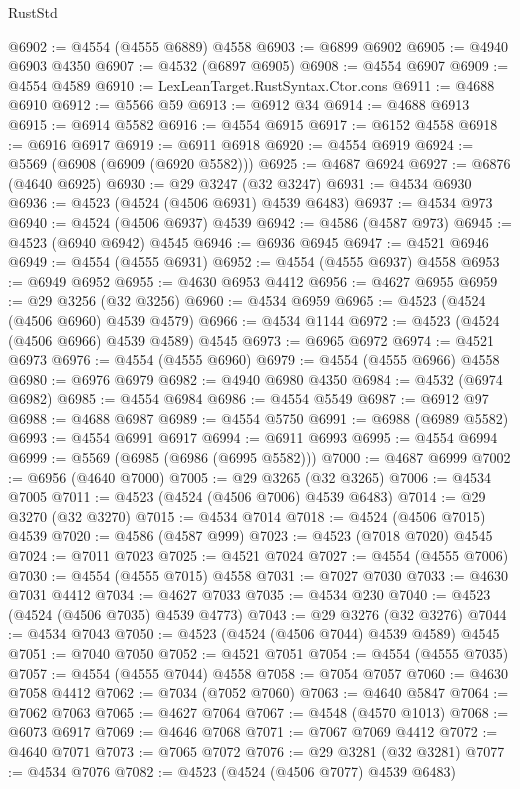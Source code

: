 \begin{lexlean}{RustStd}
\begin{coremodule}
@6902 := @4554 (@4555 @6889) @4558
@6903 := @6899 @6902
@6905 := @4940 @6903 @4350
@6907 := @4532 (@6897 @6905)
@6908 := @4554 @6907
@6909 := @4554 @4589
@6910 := LexLeanTarget.RustSyntax.Ctor.cons
@6911 := @4688 @6910
@6912 := @5566 @59
@6913 := @6912 @34
@6914 := @4688 @6913
@6915 := @6914 @5582
@6916 := @4554 @6915
@6917 := @6152 @4558
@6918 := @6916 @6917
@6919 := @6911 @6918
@6920 := @4554 @6919
@6924 := @5569 (@6908 (@6909 (@6920 @5582)))
@6925 := @4687 @6924
@6927 := @6876 (@4640 @6925)
@6930 := @29 @3247 (@32 @3247)
@6931 := @4534 @6930
@6936 := @4523 (@4524 (@4506 @6931) @4539 @6483)
@6937 := @4534 @973
@6940 := @4524 (@4506 @6937) @4539
@6942 := @4586 (@4587 @973)
@6945 := @4523 (@6940 @6942) @4545
@6946 := @6936 @6945
@6947 := @4521 @6946
@6949 := @4554 (@4555 @6931)
@6952 := @4554 (@4555 @6937) @4558
@6953 := @6949 @6952
@6955 := @4630 @6953 @4412
@6956 := @4627 @6955
@6959 := @29 @3256 (@32 @3256)
@6960 := @4534 @6959
@6965 := @4523 (@4524 (@4506 @6960) @4539 @4579)
@6966 := @4534 @1144
@6972 := @4523 (@4524 (@4506 @6966) @4539 @4589) @4545
@6973 := @6965 @6972
@6974 := @4521 @6973
@6976 := @4554 (@4555 @6960)
@6979 := @4554 (@4555 @6966) @4558
@6980 := @6976 @6979
@6982 := @4940 @6980 @4350
@6984 := @4532 (@6974 @6982)
@6985 := @4554 @6984
@6986 := @4554 @5549
@6987 := @6912 @97
@6988 := @4688 @6987
@6989 := @4554 @5750
@6991 := @6988 (@6989 @5582)
@6993 := @4554 @6991 @6917
@6994 := @6911 @6993
@6995 := @4554 @6994
@6999 := @5569 (@6985 (@6986 (@6995 @5582)))
@7000 := @4687 @6999
@7002 := @6956 (@4640 @7000)
@7005 := @29 @3265 (@32 @3265)
@7006 := @4534 @7005
@7011 := @4523 (@4524 (@4506 @7006) @4539 @6483)
@7014 := @29 @3270 (@32 @3270)
@7015 := @4534 @7014
@7018 := @4524 (@4506 @7015) @4539
@7020 := @4586 (@4587 @999)
@7023 := @4523 (@7018 @7020) @4545
@7024 := @7011 @7023
@7025 := @4521 @7024
@7027 := @4554 (@4555 @7006)
@7030 := @4554 (@4555 @7015) @4558
@7031 := @7027 @7030
@7033 := @4630 @7031 @4412
@7034 := @4627 @7033
@7035 := @4534 @230
@7040 := @4523 (@4524 (@4506 @7035) @4539 @4773)
@7043 := @29 @3276 (@32 @3276)
@7044 := @4534 @7043
@7050 := @4523 (@4524 (@4506 @7044) @4539 @4589) @4545
@7051 := @7040 @7050
@7052 := @4521 @7051
@7054 := @4554 (@4555 @7035)
@7057 := @4554 (@4555 @7044) @4558
@7058 := @7054 @7057
@7060 := @4630 @7058 @4412
@7062 := @7034 (@7052 @7060)
@7063 := @4640 @5847
@7064 := @7062 @7063
@7065 := @4627 @7064
@7067 := @4548 (@4570 @1013)
@7068 := @6073 @6917
@7069 := @4646 @7068
@7071 := @7067 @7069 @4412
@7072 := @4640 @7071
@7073 := @7065 @7072
@7076 := @29 @3281 (@32 @3281)
@7077 := @4534 @7076
@7082 := @4523 (@4524 (@4506 @7077) @4539 @6483)

\end{coremodule}
\end{lexlean}
